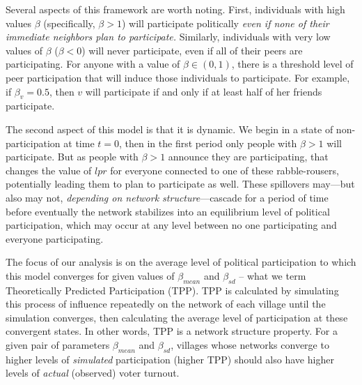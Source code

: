 \documentclass[12pt]{article}
\begin{document}
Several aspects of this framework are worth noting. First, individuals with high values $\beta$ (specifically, $\beta > 1$) will participate politically \emph{even if none of their immediate neighbors plan to participate.} Similarly, individuals with very low values of $\beta$ ($\beta < 0$) will never participate, even if all of their peers are participating. For anyone with a value of $\beta \in (0, 1)$, there is a threshold level of peer participation that will induce those individuals to participate. For example, if $\beta_v = 0.5$, then $v$ will participate if and only if at least  half of her friends participate.

The second aspect of this model is that it is %
dynamic. We begin in a state of non-participation at time $t=0$, then in the first period only people with $\beta > 1$ will participate. But as people with $\beta > 1$ announce they are participating, that changes the value of $lpr$ for everyone connected to one of these rabble-rousers, potentially leading them to plan to participate as well. These spillovers may---but also may not, {\it depending on network structure}---cascade for a period of time before eventually the network stabilizes into an equilibrium level of political participation, which may occur at any level between no one participating and everyone participating.

The focus of our analysis is on the average level of political participation to which this model converges for given values of $\beta_{mean}$ and $\beta_{sd}$ -- what we term Theoretically Predicted Participation (TPP). TPP is calculated by simulating this process of influence repeatedly on the network of each village until the simulation converges, then calculating the average level of participation at these convergent states. In other words, TPP is a network structure property. For a given pair of parameters $\beta_{mean}$ and $\beta_{sd}$, villages whose networks converge to higher levels of {\it simulated} participation (higher TPP) %
should also have higher levels of {\it actual} (observed) voter turnout.

\end{document}

